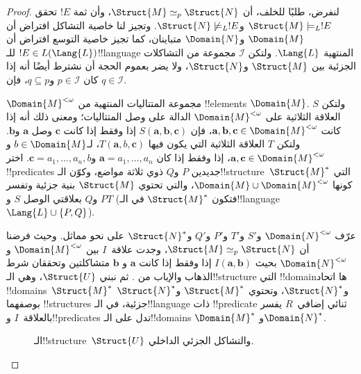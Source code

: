 \documentclass[../../../include/open-logic-section]{subfiles}
\begin{document}
\begin{proof}
لنفرض، طلبًا للخلف، أن $\Struct{M} \simeq_p \Struct{N}$، وأن ثمة $!E$ تحقق
$\Struct{M} \models_L !E$ و$\Struct{N} \not\models_L !E$. وتجيز لنا خاصية
التشاكل افتراض أن $\Domain{M}$ و$\Domain{N}$ متباينان، كما تجيز خاصية
التوسع افتراض أن $!E \in L(\Lang{L})$ للـ!!{language} المنتهية
$\Lang{L}$. ولتكن $\mathcal{I}$ مجموعة من التشاكلات الجزئية بين
$\Struct{M}$ و$\Struct{N}$، ولا يضر بعموم الحجة أن نشترط أيضًا أنه إذا
كان $p \in \mathcal{I}$ و$q \subseteq p$، فإن $q \in \mathcal{I}$.

$\Domain{M}^{<\omega}$ مجموعة المتتاليات المنتهية من !!{element}s
$\Domain{M}$. ولتكن $S$ العلاقة الثلاثية على $\Domain{M}^{<\omega}$
الدالة على وصل المتتاليات؛ ومعنى ذلك أنه إذا كانت
$\mathbf{a},\mathbf{b},\mathbf{c} \in \Domain{M}^{<\omega}$، فإن
$S(\mathbf{a},\mathbf{b},\mathbf{c})$ إذا وفقط إذا كانت $\mathbf{c}$
وصل $\mathbf{a}$ و$\mathbf{b}$. ولتكن $T$ العلاقة الثلاثية التي يكون
فيها $T(\mathbf{a},b,\mathbf{c})$، لـ$b \in \Domain{M}$ و
$\mathbf{a},\mathbf{c} \in \Domain{M}^{<\omega}$، إذا وفقط إذا كان
$\mathbf{a}=a_1,\dots,a_n$ و$\mathbf{c}=a_1,\dots,a_n,b$. اختر
!!{predicate}s جديدين $P$ و$Q$ ذوي ثلاثة مواضع، وكوّن
الـ!!{structure}~$\Struct{M}^*$ التي كونها
$\Domain{M} \cup \Domain{M}^{<\omega}$، والتي تحتوي $\Struct{M}$
بنية جزئية وتفسر $P$ و$Q$ بعلاقتي الوصل $S$ و$T$ (فتكون
$\Struct{M}^*$ في الـ!!{language}~$\Lang{L} \cup \{P,Q\}$).

عرّف $\Domain{N}^{<\omega}$ و$S'$ و$T'$ و$P'$ و$Q'$ و$\Struct{N}^*$
على نحو مماثل. وحيث فرضنا أن $\Struct{M} \simeq_p \Struct{N}$، وجدت
علاقة~$I$ بين $\Domain{M}^{<\omega}$ و$\Domain{N}^{<\omega}$ بحيث
$I(\mathbf{a},\mathbf{b})$ إذا وفقط إذا كانت $\mathbf{a}$ و
$\mathbf{b}$ متشاكلتين وتحققان شرط الذهاب والإياب من
. ثم نبني $\Struct{U}$، وهي
الـ!!{structure} التي !!{domain}ها اتحاد !!{domain}s~$\Struct{M}^*$
و$\Struct{N}^*$، وتحتوي $\Struct{M}^*$ و$\Struct{N}^*$ بوصفهما
!!{structure}s جزئية، في الـ!!{language} ذات !!{predicate} ثنائي
إضافي~$R$ يفسر بالعلاقة~$I$ و!!{predicate}s تدل على الـ!!{domain}s
$\Domain{M}^*$ و$\Domain{N}^*$.

\begin{figure}[h]
  \centering
  \caption{الـ!!{structure}~$\Struct{U}$ والتشاكل الجزئي الداخلي.}
\end{figure}


\end{proof}
\end{document}
